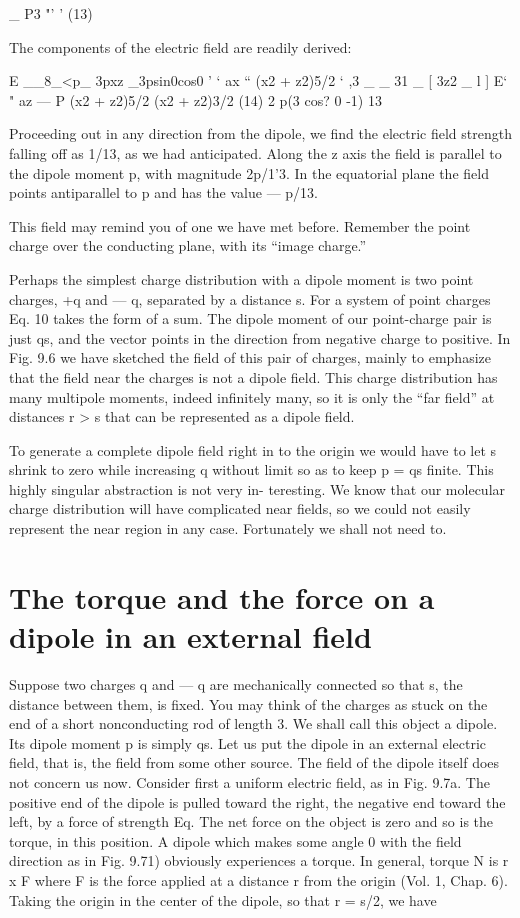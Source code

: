 {\begin{equation}
\end{equation}
_ P3
"' '  (13)

The components of the electric field are readily derived:

E __8_<p_ 3pxz _3psin0cos0
' ‘ ax `` (x2 + z2)5/2 ‘ ,3
_ _ 31 _ [ 3z2 _ l ]
E‘ " az  ---  P (x2 + z2)5/2 (x2 + z2)3/2 (14)
2 p(3 cos? 0 -1)
13

Proceeding out in any direction from the dipole, we find the electric
field strength falling off as 1/13, as we had anticipated. Along
the z axis the field is parallel to the dipole moment p, with magnitude
2p/1'3. In the equatorial plane the field points antiparallel to p and
has the value  --- p/13.

This field may remind you of one we have met before. Remember
the point charge over the conducting plane, with its ``image charge.''

Perhaps the simplest charge distribution with a dipole moment is two
point charges, +q and  --- q, separated by a distance s. For a system
of point charges Eq. 10 takes the form of a sum. The dipole moment
of our point-charge pair is just qs, and the vector points in the direction
from negative charge to positive. In Fig. 9.6 we have sketched
the field of this pair of charges, mainly to emphasize that the field
near the charges is not a dipole field. This charge distribution has
many multipole moments, indeed infinitely many, so it is only the
``far field'' at distances r > s that can be represented as a dipole field.

To generate a complete dipole field right in to the origin we would
have to let s shrink to zero while increasing q without limit so as to
keep p = qs finite. This highly singular abstraction is not very in-
teresting. We know that our molecular charge distribution will have
complicated near fields, so we could not easily represent the near
region in any case. Fortunately we shall not need to.

\section{The torque and the force on a dipole in an external field}

Suppose two charges q and  --- q are mechanically connected so
that s, the distance between them, is fixed. You may think of the
charges as stuck on the end of a short nonconducting rod of length 3.
We shall call this object a dipole. Its dipole moment p is simply qs.
Let us put the dipole in an external electric field, that is, the field from
some other source. The field of the dipole itself does not concern
us now. Consider first a uniform electric field, as in Fig. 9.7a. The
positive end of the dipole is pulled toward the right, the negative end
toward the left, by a force of strength Eq. The net force on the object
is zero and so is the torque, in this position. A dipole which makes
some angle 0 with the field direction as in Fig. 9.71) obviously experiences
a torque. In general, torque N is r x F where F is the force
applied at a distance r from the origin (Vol. 1, Chap. 6). Taking the
origin in the center of the dipole, so that r = s/2, we have

}
